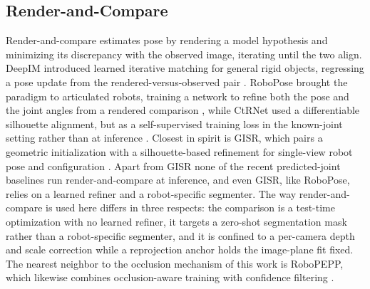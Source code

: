 \subsection{Render-and-Compare}
Render-and-compare estimates pose by rendering a model hypothesis and minimizing its discrepancy with the observed image, iterating until the two align. DeepIM introduced learned iterative matching for general rigid objects, regressing a pose update from the rendered-versus-observed pair \cite{li2018deepim}. RoboPose brought the paradigm to articulated robots, training a network to refine both the pose and the joint angles from a rendered comparison \cite{labbe2021single}, while CtRNet used a differentiable silhouette alignment, but as a self-supervised training loss in the known-joint setting rather than at inference \cite{lu2023markerless}. Closest in spirit is GISR, which pairs a geometric initialization with a silhouette-based refinement for single-view robot pose and configuration \cite{bilic2024gisr}. Apart from GISR none of the recent predicted-joint baselines run render-and-compare at inference, and even GISR, like RoboPose, relies on a learned refiner and a robot-specific segmenter. The way render-and-compare is used here differs in three respects: the comparison is a test-time optimization with no learned refiner, it targets a zero-shot segmentation mask \cite{kirillov2023segment} rather than a robot-specific segmenter, and it is confined to a per-camera depth and scale correction while a reprojection anchor holds the image-plane fit fixed. The nearest neighbor to the occlusion mechanism of this work is RoboPEPP, which likewise combines occlusion-aware training with confidence filtering \cite{goswami2025robopepp}.

